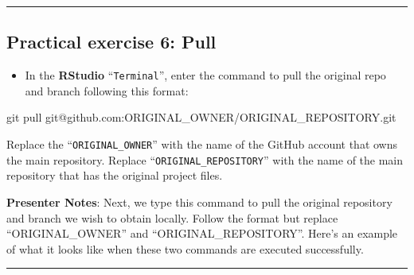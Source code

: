 \documentclass[
  letterpaper,
  DIV=11,
  numbers=noendperiod]{scrartcl}
\newenvironment{Shaded}{\begin{snugshade}}{\end{snugshade}}
\newcommand{\NormalTok}[1]{\textcolor[rgb]{0.00,0.23,0.31}{#1}}
\providecommand{\tightlist}{%
  \setlength{\itemsep}{0pt}\setlength{\parskip}{0pt}}
\begin{document}
\begin{center}\rule{0.5\linewidth}{0.5pt}\end{center}

\subsection{Practical exercise 6:
Pull}\label{practical-exercise-6-pull-1}

\begin{itemize}
\tightlist
\item[$\square$]
  In the \textbf{RStudio} ``\texttt{Terminal}'', enter the command to
  pull the original repo and branch following this format:
\end{itemize}

\begin{Shaded}
\begin{Highlighting}[]
\NormalTok{git pull git@github.com:ORIGINAL\_OWNER/ORIGINAL\_REPOSITORY.git}
\end{Highlighting}
\end{Shaded}

\begin{tcolorbox}[enhanced jigsaw, arc=.35mm, bottomrule=.15mm, bottomtitle=1mm, breakable, colback=white, colbacktitle=quarto-callout-warning-color!10!white, colframe=quarto-callout-warning-color-frame, coltitle=black, left=2mm, leftrule=.75mm, opacityback=0, opacitybacktitle=0.6, rightrule=.15mm, title=\textcolor{quarto-callout-warning-color}{\faExclamationTriangle}\hspace{0.5em}{How to properly format this command?}, titlerule=0mm, toprule=.15mm, toptitle=1mm]

Replace the ``\texttt{ORIGINAL\_OWNER}'' with the name of the GitHub
account that owns the main repository. Replace
``\texttt{ORIGINAL\_REPOSITORY}'' with the name of the main repository
that has the original project files.

\end{tcolorbox}

\textbf{Presenter Notes}: Next, we type this command to pull the
original repository and branch we wish to obtain locally. Follow the
format but replace ``ORIGINAL\_OWNER'' and ``ORIGINAL\_REPOSITORY''.
Here's an example of what it looks like when these two commands are
executed successfully.

\begin{center}\rule{0.5\linewidth}{0.5pt}\end{center}
\end{document}
